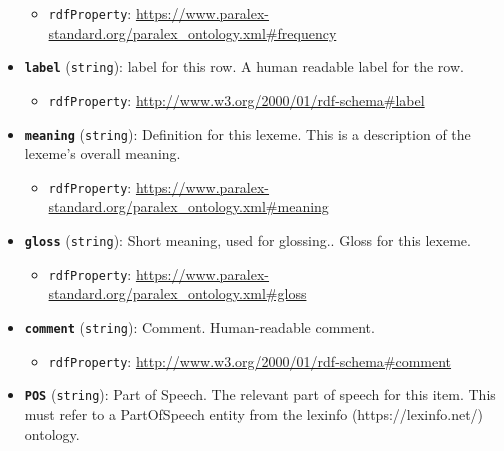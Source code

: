 \begin{itemize}
  \begin{itemize}
  \tightlist
  \item
    \texttt{rdfProperty}:
    \url{https://www.paralex-standard.org/paralex_ontology.xml\#frequency}
  \end{itemize}
\item
  \textbf{\texttt{label}} (\texttt{string}): label for this row. A human
  readable label for the row.

  \begin{itemize}
  \tightlist
  \item
    \texttt{rdfProperty}:
    \url{http://www.w3.org/2000/01/rdf-schema\#label}
  \end{itemize}
\item
  \textbf{\texttt{meaning}} (\texttt{string}): Definition for this
  lexeme. This is a description of the lexeme's overall meaning.

  \begin{itemize}
  \tightlist
  \item
    \texttt{rdfProperty}:
    \url{https://www.paralex-standard.org/paralex_ontology.xml\#meaning}
  \end{itemize}
\item
  \textbf{\texttt{gloss}} (\texttt{string}): Short meaning, used for
  glossing.. Gloss for this lexeme.

  \begin{itemize}
  \tightlist
  \item
    \texttt{rdfProperty}:
    \url{https://www.paralex-standard.org/paralex_ontology.xml\#gloss}
  \end{itemize}
\item
  \textbf{\texttt{comment}} (\texttt{string}): Comment. Human-readable
  comment.

  \begin{itemize}
  \tightlist
  \item
    \texttt{rdfProperty}:
    \url{http://www.w3.org/2000/01/rdf-schema\#comment}
  \end{itemize}
\item
  \textbf{\texttt{POS}} (\texttt{string}): Part of Speech. The relevant
  part of speech for this item. This must refer to a PartOfSpeech entity
  from the lexinfo (https://lexinfo.net/) ontology.


\end{itemize}
